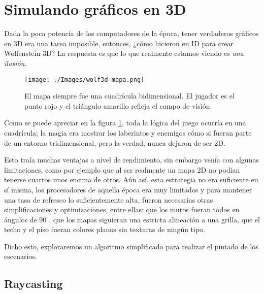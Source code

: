 \newpage

\section{Simulando gráficos en 3D}


Dada la poca potencia de los computadores de la época, tener verdaderos gráficos en 3D era una tarea imposible, entonces, ¿cómo hicieron en ID para crear Wolfenstein 3D? La respuesta es que lo que realmente estamos viendo es \emph{una ilusión}.

\begin{figure}[h!]
	\centering
	\texttt{[image: ./Images/wolf3d-mapa.png]}
	\caption{El mapa siempre fue una cuadrícula bidimensional. El jugador es el punto rojo y el triángulo amarillo refleja el campo de visión.}
	\label{wolf3d-mapa}
\end{figure}

Como se puede apreciar en la figura \ref{wolf3d-mapa}, toda la lógica del juego ocurría en una cuadrícula; la magia era mostrar los laberintos y enemigos cómo si fueran parte de un entorno tridimensional, pero la verdad, nunca dejaron de ser 2D.

Esto traía muchas ventajas a nivel de rendimiento, sin embargo venía con algunas limitaciones, como por ejemplo que al ser realmente un mapa 2D no podían tenerse cuartos unos encima de otros. Aún así, esta estrategia no era suficiente en sí misma, los procesadores de aquella época era muy limitados y para mantener una tasa de refresco lo suficientemente alta, fueron necesarias otras simplificaciones y optimizaciones, entre ellas: que los muros fueran todos en ángulos de $90^{\circ}$, que los mapas siguieran una estricta alineación a una grilla, que el techo y el piso fueran colores planos sin texturas de ningún tipo.

Dicho esto, exploraremos un algoritmo simplificado para realizar el pintado de los escenarios.

\newpage
\subsection{Raycasting}

